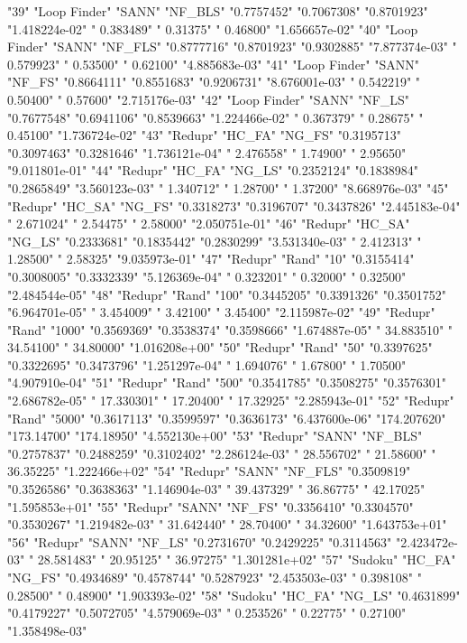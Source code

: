 "39" "Loop Finder" "SANN" "NF_BLS" "0.7757452" "0.7067308" "0.8701923" "1.418224e-02" "  0.383489" "  0.31375" "  0.46800" "1.656657e-02"
"40" "Loop Finder" "SANN" "NF_FLS" "0.8777716" "0.8701923" "0.9302885" "7.877374e-03" "  0.579923" "  0.53500" "  0.62100" "4.885683e-03"
"41" "Loop Finder" "SANN" "NF_FS" "0.8664111" "0.8551683" "0.9206731" "8.676001e-03" "  0.542219" "  0.50400" "  0.57600" "2.715176e-03"
"42" "Loop Finder" "SANN" "NF_LS" "0.7677548" "0.6941106" "0.8539663" "1.224466e-02" "  0.367379" "  0.28675" "  0.45100" "1.736724e-02"
"43" "Redupr" "HC_FA" "NG_FS" "0.3195713" "0.3097463" "0.3281646" "1.736121e-04" "  2.476558" "  1.74900" "  2.95650" "9.011801e-01"
"44" "Redupr" "HC_FA" "NG_LS" "0.2352124" "0.1838984" "0.2865849" "3.560123e-03" "  1.340712" "  1.28700" "  1.37200" "8.668976e-03"
"45" "Redupr" "HC_SA" "NG_FS" "0.3318273" "0.3196707" "0.3437826" "2.445183e-04" "  2.671024" "  2.54475" "  2.58000" "2.050751e-01"
"46" "Redupr" "HC_SA" "NG_LS" "0.2333681" "0.1835442" "0.2830299" "3.531340e-03" "  2.412313" "  1.28500" "  2.58325" "9.035973e-01"
"47" "Redupr" "Rand" "10" "0.3155414" "0.3008005" "0.3332339" "5.126369e-04" "  0.323201" "  0.32000" "  0.32500" "2.484544e-05"
"48" "Redupr" "Rand" "100" "0.3445205" "0.3391326" "0.3501752" "6.964701e-05" "  3.454009" "  3.42100" "  3.45400" "2.115987e-02"
"49" "Redupr" "Rand" "1000" "0.3569369" "0.3538374" "0.3598666" "1.674887e-05" " 34.883510" " 34.54100" " 34.80000" "1.016208e+00"
"50" "Redupr" "Rand" "50" "0.3397625" "0.3322695" "0.3473796" "1.251297e-04" "  1.694076" "  1.67800" "  1.70500" "4.907910e-04"
"51" "Redupr" "Rand" "500" "0.3541785" "0.3508275" "0.3576301" "2.686782e-05" " 17.330301" " 17.20400" " 17.32925" "2.285943e-01"
"52" "Redupr" "Rand" "5000" "0.3617113" "0.3599597" "0.3636173" "6.437600e-06" "174.207620" "173.14700" "174.18950" "4.552130e+00"
"53" "Redupr" "SANN" "NF_BLS" "0.2757837" "0.2488259" "0.3102402" "2.286124e-03" " 28.556702" " 21.58600" " 36.35225" "1.222466e+02"
"54" "Redupr" "SANN" "NF_FLS" "0.3509819" "0.3526586" "0.3638363" "1.146904e-03" " 39.437329" " 36.86775" " 42.17025" "1.595853e+01"
"55" "Redupr" "SANN" "NF_FS" "0.3356410" "0.3304570" "0.3530267" "1.219482e-03" " 31.642440" " 28.70400" " 34.32600" "1.643753e+01"
"56" "Redupr" "SANN" "NF_LS" "0.2731670" "0.2429225" "0.3114563" "2.423472e-03" " 28.581483" " 20.95125" " 36.97275" "1.301281e+02"
"57" "Sudoku" "HC_FA" "NG_FS" "0.4934689" "0.4578744" "0.5287923" "2.453503e-03" "  0.398108" "  0.28500" "  0.48900" "1.903393e-02"
"58" "Sudoku" "HC_FA" "NG_LS" "0.4631899" "0.4179227" "0.5072705" "4.579069e-03" "  0.253526" "  0.22775" "  0.27100" "1.358498e-03"
